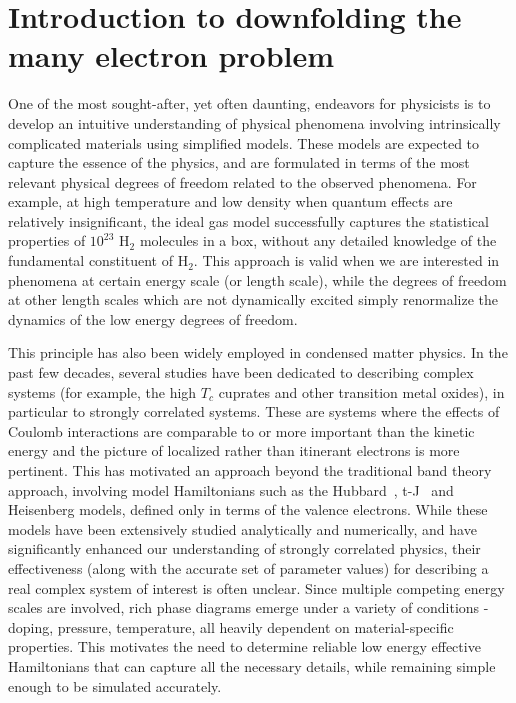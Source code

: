 \documentclass[prl,12pt,onecolumn,nofootinbib,notitlepage,english,superscriptaddress]{revtex4-1}
\begin{document}
\section{Introduction to downfolding the many electron problem}

One of the most sought-after, yet often daunting, endeavors for physicists is to develop 
an intuitive understanding of physical phenomena involving intrinsically complicated materials 
using simplified models. These models are expected to capture the essence of the physics, and are formulated in terms 
of the most relevant physical degrees of freedom related to the observed phenomena. 
For example, at high temperature and low density when quantum effects are relatively insignificant, the ideal gas model 
successfully captures the statistical properties of $10^{23}$ H$_{2}$ molecules in a box, 
without any detailed knowledge of the fundamental constituent of H$_{2}$. This approach is valid when we are interested in 
phenomena at certain energy scale (or length scale), while the degrees of freedom at other length scales which are not 
dynamically excited simply renormalize the dynamics of the low energy degrees of freedom. 

This principle has also been widely employed in condensed matter physics. In the past few decades, several studies 
have been dedicated to describing complex systems (for example, the high $T_c$ cuprates and other transition metal oxides), 
in particular to strongly correlated systems. These are systems where the effects of Coulomb 
interactions are comparable to or more important than the kinetic energy and the picture of 
localized rather than itinerant electrons is more pertinent. This has motivated an approach beyond the 
traditional band theory approach, involving model Hamiltonians such as the Hubbard~\cite{Hubbard}, t-J~\cite{tJSpalek} 
and Heisenberg models, defined only in terms of the valence electrons. 
While these models have been extensively studied analytically and numerically, and have significantly 
enhanced our understanding of strongly correlated physics, their effectiveness 
(along with the accurate set of parameter values) for describing a real complex system of interest is often unclear. Since multiple 
competing energy scales are involved, rich phase diagrams emerge under a variety of conditions - doping, pressure, 
temperature, all heavily dependent on material-specific properties. This motivates 
the need to determine reliable low energy effective Hamiltonians that can capture all the necessary details, while 
remaining simple enough to be simulated accurately.  
\end{document}

